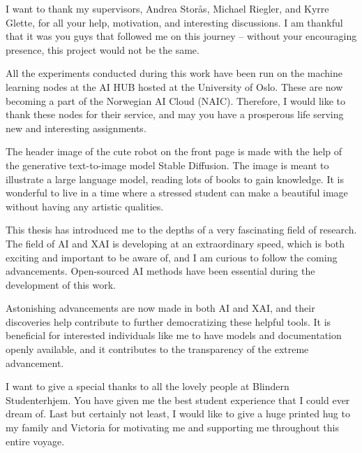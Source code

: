 \label{sec:preface}

\begin{comment}
Foreword / Preface / Acknowledgements
This is the place for "informal chat" like how the master thesis task has progressed and acknowledgment to those who one feels for thanking. One can also include what kind of software that has been used in the master thesis work. Some choose to have the foreword before the Table of Contents (TOC).
\end{comment}
I want to thank my supervisors, Andrea Storås, Michael Riegler, and Kyrre Glette, for all your help, motivation, and interesting discussions.
I am thankful that it was you guys that followed me on this journey – without your encouraging presence, this project would not be the same.

All the experiments conducted during this work have been run on the machine learning nodes at the AI HUB hosted at the University of Oslo. These are now becoming a part of the Norwegian AI Cloud (NAIC). 
Therefore, I would like to thank these nodes for their service, and may you have a prosperous life serving new and interesting assignments.

The header image of the cute robot on the front page is made with the help of the generative text-to-image model Stable Diffusion. The image is meant to illustrate a large language model, reading lots of books to gain knowledge. It is wonderful to live in a time where a stressed student can make a beautiful image without having any artistic qualities.


This thesis has introduced me to the depths of a very fascinating field of research.
The field of AI and XAI is developing at an extraordinary speed, which is both exciting and important to be aware of, and I am curious to follow the coming advancements. 
Open-sourced AI methods have been essential during the development of this work.

Astonishing advancements are now made in both AI and XAI, and their discoveries help contribute to further democratizing these helpful tools. It is beneficial for interested individuals like me to have models and documentation openly available, and it contributes to the transparency of the extreme advancement.

I want to give a special thanks to all the lovely people at Blindern Studenterhjem. You have given me the best student experience that I could ever dream of. 
Last but certainly not least, I would like to give a huge printed hug to my family and Victoria for motivating me and supporting me throughout this entire voyage.